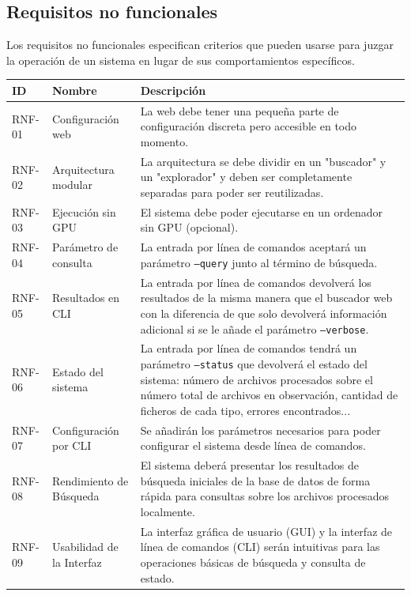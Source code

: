 \subsection{Requisitos no funcionales}
Los requisitos no funcionales especifican criterios que pueden usarse para juzgar la operación de un sistema en lugar de sus comportamientos específicos.

\begin{table}[H]
\centering
\begin{tabular}{|p{1cm}|p{4cm}|p{9cm}|}
\hline
\textbf{ID} & \textbf{Nombre} & \textbf{Descripción} \\
\hline
RNF-01 & Configuración web & La web debe tener una pequeña parte de configuración discreta pero accesible en todo momento. \\
\hline
RNF-02 & Arquitectura modular & La arquitectura se debe dividir en un "buscador" y un "explorador" y deben ser completamente separadas para poder ser reutilizadas. \\
\hline
RNF-03 & Ejecución sin GPU & El sistema debe poder ejecutarse en un ordenador sin GPU (opcional). \\
\hline
RNF-04 & Parámetro de consulta & La entrada por línea de comandos aceptará un parámetro \texttt{--query} junto al término de búsqueda. \\
\hline
RNF-05 & Resultados en CLI & La entrada por línea de comandos devolverá los resultados de la misma manera que el buscador web con la diferencia de que solo devolverá información adicional si se le añade el parámetro \texttt{--verbose}. \\
\hline
RNF-06 & Estado del sistema & La entrada por línea de comandos tendrá un parámetro \texttt{--status} que devolverá el estado del sistema: número de archivos procesados sobre el número total de archivos en observación, cantidad de ficheros de cada tipo, errores encontrados... \\
\hline
RNF-07 & Configuración por CLI & Se añadirán los parámetros necesarios para poder configurar el sistema desde línea de comandos. \\
\hline
RNF-08 & Rendimiento de Búsqueda & El sistema deberá presentar los resultados de búsqueda iniciales de la base de datos de forma rápida para consultas sobre los archivos procesados localmente. \\
\hline
RNF-09 & Usabilidad de la Interfaz & La interfaz gráfica de usuario (GUI) y la interfaz de línea de comandos (CLI) serán intuitivas para las operaciones básicas de búsqueda y consulta de estado. \\

\end{tabular}
\end{table}
